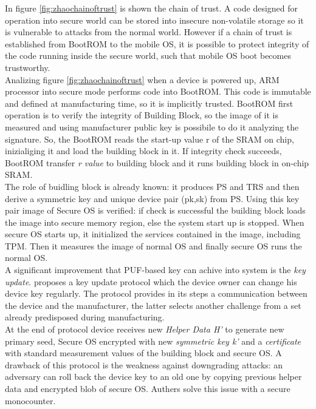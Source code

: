 \documentclass[../tesi.tex]{subfiles}
\begin{document}
{In figure \ref{fig:zhaochainoftrust} is shown the chain of trust. A code designed for operation into secure world can be stored into insecure non-volatile storage so it is vulnerable to attacks from the normal world. However if a chain of trust is established from BootROM to the mobile OS, it is possible to protect integrity of the code running inside the secure world, such that mobile OS boot becomes trustworthy. \\
Analizing figure \ref{fig:zhaochainoftrust} when a device is powered up, ARM processor into secure mode performs code into BootROM. This code is immutable and defined at manufacturing time, so it is implicitly trusted. 
BootROM first operation is to verify the integrity of Building Block, so the image of it is measured and using manufacturer public key is possibile to do it analyzing the signature. So, the BootROM reads the start-up value r of the SRAM on chip, inizialiging it and load the building block in it. If integrity check succeeds, BootROM transfer \emph{r value} to building block and it runs building block in on-chip SRAM. \\
The role of buidling block is already known: it produces PS and TRS and then derive a symmetric key and unique device pair (pk,sk) from PS. Using this key pair image of Secure OS is verified: if check is successful the building block loads the image into secure memory region, else the system start up is stopped. When secure OS starts up, it initialized the services contained in the image, including TPM.  Then it measures the image of normal OS and finally secure OS runs the normal OS. \\
A significant improvement that PUF-based key can achive into system is the \emph{key update}. \cite{zhao2014providing} proposes a key update protocol which the device owner can change his device key regularly. The protocol provides in its steps a communication between the device and the manufacturer, the latter selects another challenge from a set already predisposed during manufacturing. \\
At the end of protocol device receives new \emph{Helper Data H'} to generate new primary seed, Secure OS encrypted with new \emph{symmetric key k'} and a \emph{certificate} with standard measurement values of the building block and secure OS. A drawback of this protocol is the weakness against downgrading attacks: an adversary can roll back the device key to an old one by copying previous helper data and encrypted blob of secure OS. Authers solve this issue with a secure monocounter. \\
}
\end{document}
